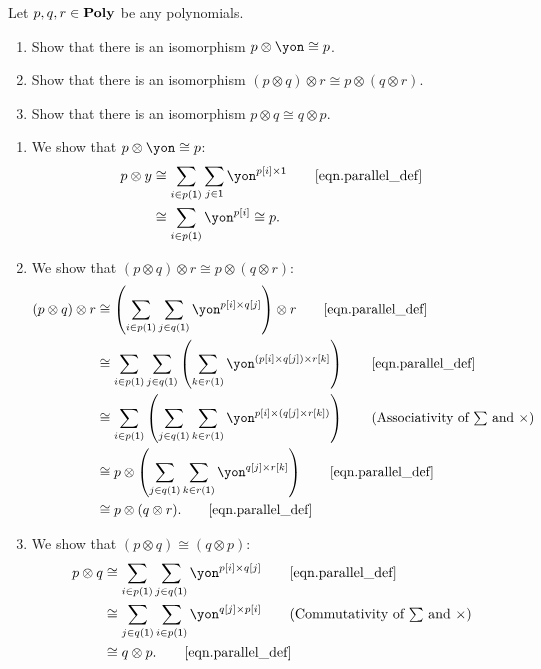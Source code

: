 \documentclass[Book-Poly]{subfiles}
\begin{document}
\begin{exercise}\label{exc.prepare_poly_smc}
Let $p,q,r\in\mathbf{Poly}$ be any polynomials.
\begin{enumerate}
  \item Show that there is an isomorphism $p\otimes\yon\cong p$.
  \item Show that there is an isomorphism $(p\otimes q)\otimes r\cong p\otimes (q\otimes r)$.
  \item Show that there is an isomorphism $p\otimes q \cong q\otimes p$.
 \qedhere
\end{enumerate}
\begin{solution}
\begin{enumerate}
  \item We show that $p\otimes\yon\cong p$:
  \begin{align*}
      p \otimes y &\iso \sum_{i \in p(\1)} \sum_{j \in \1} \yon^{p[i] \times \1} \tag*{\eqref{eqn.parallel_def}} \\
      &\iso \sum_{i \in p(\1)} \yon^{p[i]} \iso p.
  \end{align*}
  
  \item We show that $(p\otimes q)\otimes r\cong p\otimes (q\otimes r)$:
  \begin{align*}
      (p \otimes q) \otimes r &\iso \left(\sum_{i \in p(\1)} \sum_{j \in q(\1)} \yon^{p[i] \times q[j]}\right) \otimes r \tag*{\eqref{eqn.parallel_def}} \\
      &\iso \sum_{i \in p(\1)} \sum_{j \in q(\1)} \left(\sum_{k \in r(\1)} \yon^{(p[i] \times q[j]) \times r[k]}\right) \tag*{\eqref{eqn.parallel_def}} \\
      &\iso \sum_{i \in p(\1)} \left(\sum_{j \in q(\1)} \sum_{k \in r(\1)} \yon^{p[i] \times (q[j] \times r[k])}\right) \tag{Associativity of $\sum$ and $\times$} \\
      &\iso p \otimes \left(\sum_{j \in q(\1)} \sum_{k \in r(\1)} \yon^{q[j] \times r[k]}\right) \tag*{\eqref{eqn.parallel_def}} \\
      &\iso p \otimes (q \otimes r). \tag*{\eqref{eqn.parallel_def}} \\
  \end{align*}
  
  \item We show that $(p\otimes q)\cong(q\otimes p)$:
  \begin{align*}
      p \otimes q &\iso \sum_{i \in p(\1)} \sum_{j \in q(\1)} \yon^{p[i] \times q[j]} \tag*{\eqref{eqn.parallel_def}} \\
      &\iso \sum_{j \in q(\1)} \sum_{i \in p(\1)} \yon^{q[j] \times p[i]} \tag{Commutativity of $\sum$ and $\times$} \\
      &\iso q \otimes p. \tag*{\eqref{eqn.parallel_def}} \\
  \end{align*}
\end{enumerate}
\end{solution}
\end{exercise}
\end{document}
